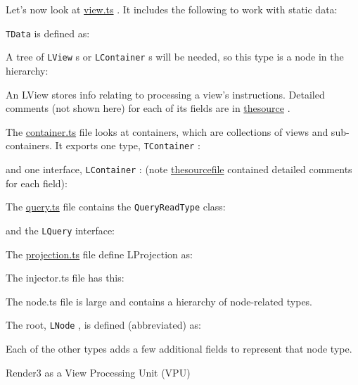 Let’s now look at
\url{view.ts}
. It includes the following to work with static data:



\texttt{TData}
is defined as:



A tree of
\texttt{LView}
s or
\texttt{LContainer}
s will be needed, so this type is a node in the
hierarchy:



An LView stores info relating to processing a view’s instructions. Detailed comments
(not shown here) for each of its fields are in
\url{thesource}
.



The
\url{container.ts}
file looks at containers, which are collections of views and sub-
containers. It exports one type,
\texttt{TContainer}
:



and one interface,
\texttt{LContainer}
: (note
\url{thesourcefile}
contained detailed comments for
each field):



The
\url{query.ts}
file contains the
\texttt{QueryReadType}
class:



and the
\texttt{LQuery}
interface:



The
\url{projection.ts}
file define LProjection as:



The injector.ts file has this:



The node.ts file is large and contains a hierarchy of node-related types.

The root,
\texttt{LNode}
, is defined (abbreviated) as:



Each of the other types adds a few additional fields to represent that node type.

Render3 as  a View Processing Unit (VPU)
